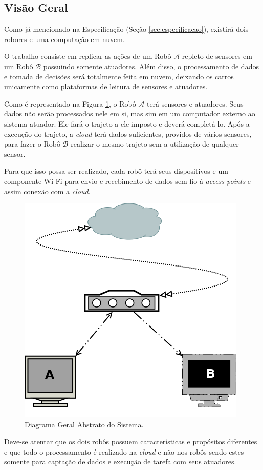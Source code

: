\documentclass[portugues, brazil, a4paper,12pt]{article}
\begin{document}
	\subsection{Visão Geral}
		Como já mencionado na Especificação (Seção \ref{sec:especificacao}), existirá dois robores e uma computação em nuvem.

		O trabalho consiste em replicar as ações de um Robô $ \mathcal{A} $ repleto de sensores em um Robô $ \mathcal{B} $ possuindo somente atuadores. Além disso, o processamento de dados e tomada de decisões será totalmente feita em nuvem, deixando os carros unicamente como plataformas de leitura de sensores e atuadores.

		Como é representado na Figura \ref{fig:diagrama}, o Robô $ \mathcal{A} $ terá sensores e atuadores. Seus dados não serão processados nele em si, mas sim em um computador externo ao sistema atuador. Ele fará o trajeto a ele imposto e deverá completá-lo. Após a execução do trajeto, a \textit{cloud} terá dados suficientes, providos de vários sensores, para fazer o Robô $ \mathcal{B} $ realizar o mesmo trajeto sem a utilização de qualquer sensor.

		Para que isso possa ser realizado, cada robô terá seus dispositivos e um componente Wi-Fi para envio e recebimento de dados sem fio à \textit{access points} e assim conexão com a \textit{cloud}.

		\begin{figure}[H]
			\centering
			\includegraphics[width=0.5\linewidth]{img/diagrama_geral.png}
			\caption{Diagrama Geral Abstrato do Sistema.}
			\label{fig:diagrama}
		\end{figure}

		Deve-se atentar que os dois robôs possuem características e propósitos diferentes e que todo o processamento é realizado na \textit{cloud} e não nos robôs sendo estes somente para captação de dados e execução de tarefa com seus atuadores.
\end{document}
